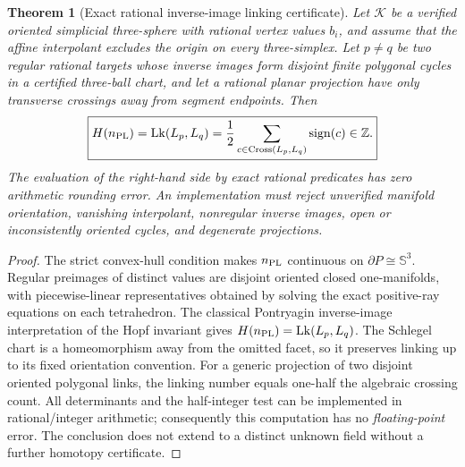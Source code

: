 \documentclass[aps,prd,onecolumn,notitlepage,11pt,superscriptaddress,longbibliography]{revtex4-2}
\newtheorem{theorem}{Theorem}
\newcommand{\Sph}{\mathbb S}
\begin{document}
\begin{theorem}[Exact rational inverse-image linking certificate]\label{th:v8link}
Let $\mathcal K$ be a verified oriented simplicial three-sphere with rational vertex values $b_i$, and assume that the affine interpolant excludes the origin on every three-simplex. Let $p\ne q$ be two regular rational targets whose inverse images form disjoint finite polygonal cycles in a certified three-ball chart, and let a rational planar projection have only transverse crossings away from segment endpoints. Then
\begin{equation}\boxed{
  H(n_{\rm PL})=\operatorname{Lk}(L_p,L_q)
    =\frac12\sum_{c\in\operatorname{Cross}(L_p,L_q)}\operatorname{sign}(c)\in\mathbb Z.
}\label{eq:v8link}
\end{equation}
The evaluation of the right-hand side by exact rational predicates has \emph{zero arithmetic rounding error}. An implementation must reject unverified manifold orientation, vanishing interpolant, nonregular inverse images, open or inconsistently oriented cycles, and degenerate projections.
\end{theorem}
\begin{proof}
The strict convex-hull condition makes $n_{\rm PL}$ continuous on $\partial P\cong\Sph^3$. Regular preimages of distinct values are disjoint oriented closed one-manifolds, with piecewise-linear representatives obtained by solving the exact positive-ray equations on each tetrahedron. The classical Pontryagin inverse-image interpretation of the Hopf invariant gives $H(n_{\rm PL})=\operatorname{Lk}(L_p,L_q)$. The Schlegel chart is a homeomorphism away from the omitted facet, so it preserves linking up to its fixed orientation convention. For a generic projection of two disjoint oriented polygonal links, the linking number equals one-half the algebraic crossing count. All determinants and the half-integer test can be implemented in rational/integer arithmetic; consequently this computation has no \emph{floating-point} error. The conclusion does not extend to a distinct unknown field without a further homotopy certificate.
\end{proof}
\end{document}
